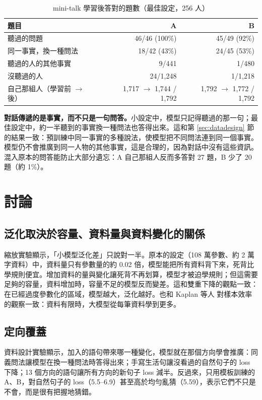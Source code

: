\documentclass[11pt,a4paper]{article}
\begin{document}
\begin{table}[H]
\centering
\caption{mini-talk 學習後答對的題數（最佳設定，256 人）}\label{tab:talkbest}
\begin{tabular}{lrr}
\toprule
題目 & A & B \\
\midrule
聽過的問題 & 46/46 (100\%) & 45/49 (92\%) \\
同一事實，換一種問法 & 18/42 (43\%) & 24/45 (53\%) \\
聽過的人的其他事實 & 9/441 & 1/480 \\
沒聽過的人 & 24/1,248 & 1/1,218 \\
自己那組人（學習前 $\to$ 後） & 1,717 $\to$ 1,744 / 1,792 & 1,792 $\to$ 1,772 / 1,792 \\
\bottomrule
\end{tabular}
\end{table}

\textbf{對話傳遞的是事實，而不只是一句問答。}小設定中，模型只記得聽過的那一句；最佳設定中，約一半聽到的事實換一種問法也答得出來。這和第 \ref{sec:datadesign} 節的結果一致：預訓練中同一事實的多種說法，使模型把不同問法連到同一個事實。模型仍不會推廣到同一人物的其他事實，這是合理的，因為對話中沒有這些資訊。混入原本的問答能防止大部分遺忘：A 自己那組人反而多答對 27 題，B 少了 20 題（約 1\%）。

\section{討論}\label{sec:discussion}

\subsection{泛化取決於容量、資料量與資料變化的關係}

縮放實驗顯示，「小模型泛化差」只說對一半。原本的設定（108 萬參數、約 2 萬字資料）中，資料量只有參數量的約 0.02 倍，模型能把所有資料背下來，死背比學規則便宜。增加資料的量與變化讓死背不再划算，模型才被迫學規則；但這需要足夠的容量，資料增加時，容量不足的模型反而變差。這和雙重下降的觀點一致：在已經過度參數化的區域，模型越大，泛化越好。也和 Kaplan 等人 \cite{kaplan2020scaling} 對樣本效率的觀察一致：資料有限時，大模型從每筆資料學到更多。

\subsection{定向覆蓋}

資料設計實驗顯示，加入的語句帶來哪一種變化，模型就在那個方向學會推廣：同義問法讓模型在換一種問法時答得出來；手寫生活句讓沒看過的自然句子的 loss 下降；13 個方向的語句讓所有方向的新句子 loss 減半。反過來，只用模板訓練的 A、B，對自然句子的 loss（5.5--6.9）甚至高於均勻亂猜（5.59），表示它們不只是不會，而是很有把握地猜錯。
\end{document}
